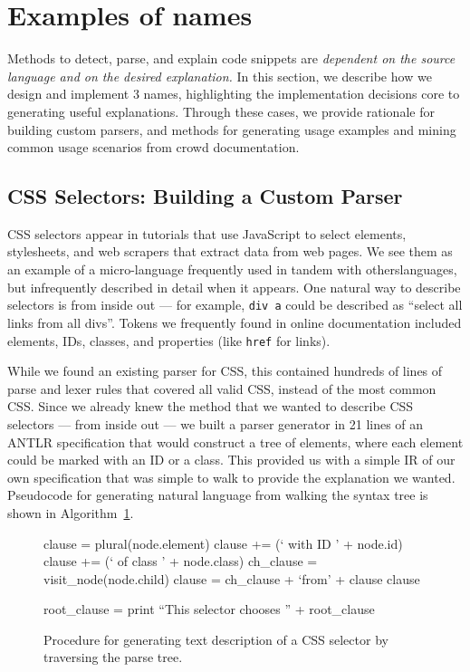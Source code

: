 \section{Examples of \Glspl{name}}

Methods to detect, parse, and explain code snippets are \emph{dependent on the source language and on the desired explanation.}
In this section, we describe how we design and implement 3 \glspl{name}, highlighting the implementation decisions core to generating useful explanations.
Through these cases, we provide rationale for building custom parsers, and methods for generating usage examples and mining common usage scenarios from crowd documentation.

\subsection{CSS Selectors: Building a Custom Parser}

CSS selectors appear in tutorials that use JavaScript to select elements, stylesheets, and web scrapers that extract data from web pages.
We see them as an example of a micro-language frequently used in tandem with otherslanguages, but infrequently described in detail when it appears.
One natural way to describe selectors is from inside out --- for example, \texttt{div a} could be described as ``select all links from all divs''.
Tokens we frequently found in online documentation included elements, IDs, classes, and properties (like \texttt{href} for links).

While we found an existing parser for CSS, this contained hundreds of lines of parse and lexer rules that covered all valid CSS, instead of the most common CSS.
Since we already knew the method that we wanted to describe CSS selectors --- from inside out --- we built a parser generator in 21 lines of an ANTLR specification that would construct a tree of elements, where each element could be marked with an ID or a class.
This provided us with a simple IR of our own specification that was simple to walk to provide the explanation we wanted.
Pseudocode for generating natural language from walking the syntax tree is shown in Algorithm~\ref{alg:css_traversal}.

\begin{figure}
\begin{algorithmic}

    \State clause = plural(node.element)
        \State clause += (` with ID ' + node.id)
        \State clause += (` of class ' + node.class)
    \EndIf
        \State ch\_clause = visit\_node(node.child)
        \State clause = ch\_clause + `from' + clause
    \EndIf
    \State \Return clause
\EndFunction

\State
{}
    \State root\_clause = 
    \State print ``This selector chooses '' + root\_clause
\EndFunction

\end{algorithmic}
\label{alg:css_traversal}
\caption{Procedure for generating text description of a CSS selector by traversing the parse tree.
}
\end{figure}

